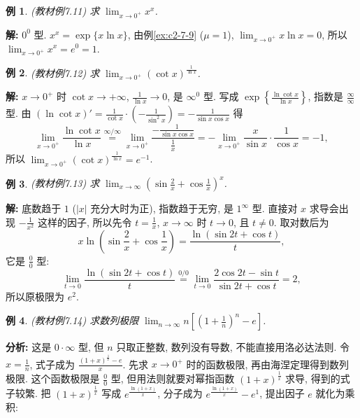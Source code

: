 \documentclass[UTF8,openany]{ctexbook}
\theoremstyle{chinesetextbook}
\newtheorem{example}{例}[section]
\newenvironment{cnsolution}{\par\indent\textbf{解:} \ignorespaces}{\par}
\begin{document}
\begin{example}\label{ex:c2-7-11}
\textnormal{(教材例7.11)} 求 $\displaystyle\lim_{x\to0^+}x^x$.
\end{example}
\begin{cnsolution}
$0^0$ 型. $x^x=\exp\{x\ln x\}$, 由例\ref{ex:c2-7-9} ($\mu=1$), $\displaystyle\lim_{x\to0^+}x\ln x=0$, 所以 $\displaystyle\lim_{x\to0^+}x^x=e^0=1$.
\end{cnsolution}
\begin{example}\label{ex:c2-7-12}
\textnormal{(教材例7.12)} 求 $\displaystyle\lim_{x\to0^+}(\cot x)^{\frac1{\ln x}}$.
\end{example}
\begin{cnsolution}
$x\to0^+$ 时 $\cot x\to+\infty$, $\displaystyle\frac1{\ln x}\to0$, 是 $\infty^0$ 型. 写成 $\displaystyle\exp\left\{\frac{\ln\cot x}{\ln x}\right\}$, 指数是 $\displaystyle\frac\infty\infty$ 型. 由 $\displaystyle(\ln\cot x)'=\frac1{\cot x}\cdot\left(-\frac1{\sin^2x}\right)=-\frac1{\sin x\cos x}$ 得
\[
\lim_{x\to0^+}\frac{\ln\cot x}{\ln x}\overset{\infty/\infty}{=}\lim_{x\to0^+}\frac{-\frac1{\sin x\cos x}}{\frac1x}=-\lim_{x\to0^+}\frac x{\sin x}\cdot\frac1{\cos x}=-1,
\]
所以 $\displaystyle\lim_{x\to0^+}(\cot x)^{\frac1{\ln x}}=e^{-1}$.
\end{cnsolution}
\begin{example}\label{ex:c2-7-13}
\textnormal{(教材例7.13)} 求 $\displaystyle\lim_{x\to\infty}\left(\sin\frac2x+\cos\frac1x\right)^x$.
\end{example}
\begin{cnsolution}
底数趋于 $1$ ($|x|$ 充分大时为正), 指数趋于无穷, 是 $1^\infty$ 型. 直接对 $x$ 求导会出现 $\displaystyle-\frac1{x^2}$ 这样的因子, 所以先令 $\displaystyle t=\frac1x$, $x\to\infty$ 时 $t\to0$, 且 $t\ne0$. 取对数后为
\[
x\ln\left(\sin\frac2x+\cos\frac1x\right)=\frac{\ln(\sin2t+\cos t)}t,
\]
它是 $\displaystyle\frac00$ 型:
\[
\lim_{t\to0}\frac{\ln(\sin2t+\cos t)}t\overset{0/0}{=}\lim_{t\to0}\frac{2\cos2t-\sin t}{\sin2t+\cos t}=2,
\]
所以原极限为 $e^2$.
\end{cnsolution}
\begin{example}\label{ex:c2-7-14}
\textnormal{(教材例7.14)} 求数列极限 $\displaystyle\lim_{n\to\infty}n\left[\left(1+\frac1n\right)^n-e\right]$.
\end{example}
\par\indent\textbf{分析:} 这是 $0\cdot\infty$ 型, 但 $n$ 只取正整数, 数列没有导数, 不能直接用洛必达法则. 令 $\displaystyle x=\frac1n$, 式子成为 $\displaystyle\frac{(1+x)^{\frac1x}-e}x$. 先求 $x\to0^+$ 时的函数极限, 再由海涅定理得到数列极限. 这个函数极限是 $\displaystyle\frac00$ 型, 但用法则就要对幂指函数 $(1+x)^{\frac1x}$ 求导, 得到的式子较繁. 把 $(1+x)^{\frac1x}$ 写成 $e^{\frac{\ln(1+x)}x}$, 分子成为 $e^{\frac{\ln(1+x)}x}-e^1$, 提出因子 $e$ 就化为乘积:
\end{document}
